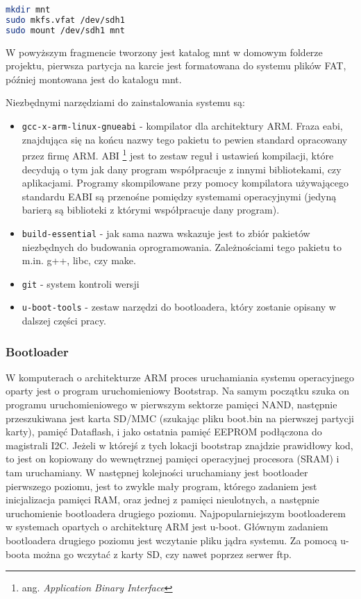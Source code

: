 \begin{lstlisting}[language=bash]
mkdir mnt
sudo mkfs.vfat /dev/sdh1
sudo mount /dev/sdh1 mnt
\end{lstlisting}

W powyższym fragmencie tworzony jest katalog mnt w domowym folderze projektu, pierwsza partycja na karcie jest formatowana do systemu plików FAT, później montowana jest do katalogu mnt.


Niezbędnymi narzędziami do zainstalowania systemu są:
\begin{itemize}
	\item {\lstinline|gcc-x-arm-linux-gnueabi|}  - kompilator dla architektury ARM. Fraza eabi, znajdująca się na końcu nazwy tego pakietu to pewien standard opracowany przez firmę ARM. ABI  \footnote{ang. \emph{Application Binary Interface}} jest to zestaw reguł i ustawień kompilacji, które decydują o tym jak dany program współpracuje z innymi bibliotekami, czy aplikacjami. Programy skompilowane przy pomocy kompilatora używającego standardu EABI są przenośne pomiędzy systemami operacyjnymi (jedyną barierą są biblioteki z którymi współpracuje dany program).
	\item {\lstinline|build-essential|} - jak sama nazwa wskazuje jest to zbiór pakietów niezbędnych do budowania oprogramowania. Zależnościami tego pakietu to m.in. g++, libc, czy make.
	\item {\lstinline|git|} - system kontroli wersji
	\item {\lstinline|u-boot-tools|} - zestaw narzędzi do bootloadera, który zostanie opisany w dalszej części pracy.
\end{itemize}


\subsubsection{Bootloader}

W komputerach o architekturze ARM proces uruchamiania systemu operacyjnego oparty jest o program uruchomieniowy Bootstrap. Na samym początku szuka on programu uruchomieniowego w pierwszym sektorze pamięci NAND, następnie przeszukiwana jest karta SD/MMC (szukając pliku boot.bin na pierwszej partycji karty), pamięć Dataflash, i jako ostatnia pamięć EEPROM podłączona do magistrali I2C. Jeżeli w którejś z tych lokacji bootstrap znajdzie prawidłowy kod, to jest on kopiowany do wewnętrznej pamięci operacyjnej procesora (SRAM) i tam uruchamiany. W następnej kolejności uruchamiany jest bootloader pierwszego poziomu, jest to zwykle mały program, którego zadaniem jest inicjalizacja pamięci RAM, oraz jednej z pamięci nieulotnych, a następnie uruchomienie bootloadera drugiego poziomu.
Najpopularniejszym bootloaderem w systemach opartych o architekturę ARM jest u-boot. Głównym zadaniem bootloadera drugiego poziomu jest wczytanie pliku jądra systemu. Za pomocą u-boota można go wczytać z karty SD, czy nawet poprzez serwer ftp.

